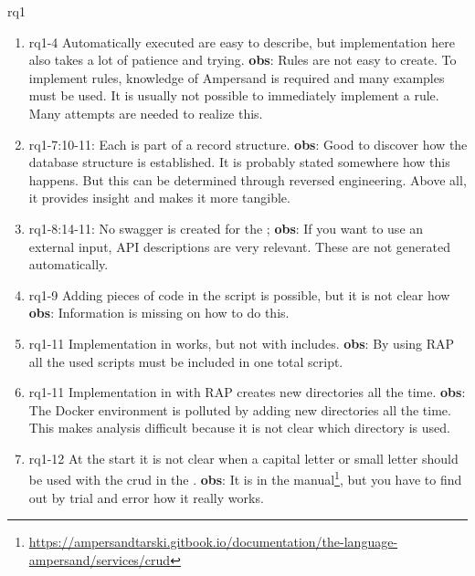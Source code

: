 \def\rq{rq1}

\acrlong{\rq}
\begin{enumerate}
    \item rq1-4 Automatically executed  are easy to describe, but implementation here also takes a lot of patience and trying.
    \newline\textbf{obs}: Rules are not easy to create.
    To implement rules, knowledge of Ampersand is required and many examples must be used.
    It is usually not possible to immediately implement a rule.
    Many attempts are needed to realize this.

    \item rq1-7:10-11: Each  is part of a record structure.
    \newline\textbf{obs}: Good to discover how the database structure is established.
    It is probably stated somewhere how this happens.
    But this can be determined through reversed engineering.
    Above all, it provides insight and makes it more tangible.

    \item rq1-8:14-11: No swagger is created for the ;
    \newline\textbf{obs}: If you want to use an external input, API descriptions are very relevant.
    These are not generated automatically.
    
    \item rq1-9 Adding pieces of  code in the script is possible, but it is not clear how
    \newline\textbf{obs}: Information is missing  on how to do this.
     
    \item rq1-11 Implementation in  works, but not with includes.
    \newline\textbf{obs}: By using RAP all the used scripts must be included in one total script.
     
    \item rq1-11 Implementation in  with RAP creates new directories all the time.
    \newline\textbf{obs}: The Docker environment is polluted by adding new directories all the time.
    This makes analysis difficult because it is not clear which directory is used.
    
    \item rq1-12 At the start it is not clear when a capital letter or small letter should be used with the crud in the .
    \newline\textbf{obs}: It is in the manual\footnote{\url{https://ampersandtarski.gitbook.io/documentation/the-language-ampersand/services/crud}}, 
    but you have to find out by trial and error how it really works.
    

\end{enumerate}
